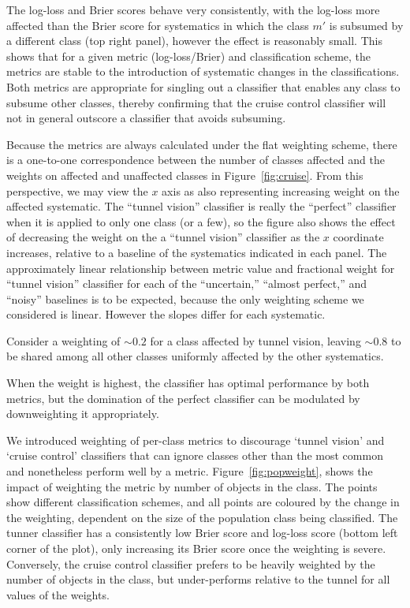 The log-loss and Brier scores behave very consistently, with the log-loss more affected than the Brier score for systematics in which the class $m'$ is subsumed by a different class (top right panel), however the effect is reasonably small.
This shows that for a given metric (log-loss/Brier) and classification scheme, the metrics are stable to the introduction of systematic changes in the classifications.
Both metrics are appropriate for singling out a classifier that enables any class to subsume other classes, thereby confirming that the cruise control classifier will not in general outscore a classifier that avoids subsuming.

Because the metrics are always calculated under the flat weighting scheme, there is a one-to-one correspondence between the number of classes affected and the weights on affected and unaffected classes in Figure~\ref{fig:cruise}.
From this perspective, we may view the $x$ axis as also representing increasing weight on the affected systematic.
The ``tunnel vision'' classifier is really the ``perfect'' classifier when it is applied to only one class (or a few), so the figure also shows the effect of decreasing the weight on the a ``tunnel vision'' classifier as the $x$ coordinate increases, relative to a baseline of the systematics indicated in each panel.
The approximately linear relationship between metric value and fractional weight for ``tunnel vision'' classifier for each of the ``uncertain,'' ``almost perfect,'' and ``noisy'' baselines is to be expected, because the only weighting scheme we considered is linear.
However the slopes differ for each systematic.

Consider a weighting of $\sim0.2$ for a class affected by tunnel vision, leaving $\sim0.8$ to be shared among all other classes uniformly affected by the other systematics.

When the weight is highest, the classifier has optimal performance by both metrics, but the domination of the perfect classifier can be modulated by downweighting it appropriately.

We introduced weighting of per-class metrics to discourage `tunnel vision' and `cruise control' classifiers that can ignore classes other than the most common and nonetheless perform well by a metric.
Figure~\ref{fig:popweight}, shows the impact of weighting the metric by number of objects in the class.
The points show different classification schemes, and all points are coloured by the change in the weighting, dependent on the size of the population class being classified.
The tunner classifier has a consistently low Brier score and log-loss score (bottom left corner of the plot), only increasing its Brier score once the weighting is severe.
Conversely, the cruise control classifier prefers to be heavily weighted by the number of objects in the class, but under-performs relative to the tunnel for all values of the weights.

